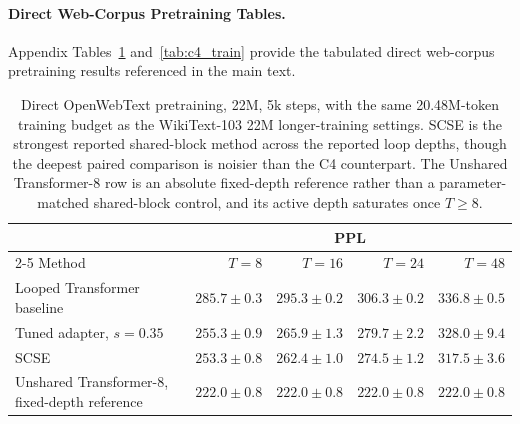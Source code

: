\documentclass[letterpaper]{article} %
\newcommand{\SCSE}{\textsc{SCSE}}
\theoremstyle{remark}
\begin{document}
\paragraph{Direct Web-Corpus Pretraining Tables.} Appendix Tables~\ref{tab:owt_train} and~\ref{tab:c4_train} provide the tabulated direct web-corpus pretraining results referenced in the main text.

\begin{table}[t!]
	\centering
	\small
	\begin{tabular}{lrrrr}
		\toprule
		                                              & \multicolumn{4}{c}{PPL}                                                                            \\
		\cmidrule(lr){2-5}
		Method                                        & $T=8$                   & $T=16$                 & $T=24$                 & $T=48$                 \\
		\midrule
		Looped Transformer baseline                   & $285.7\pm0.3$           & $295.3\pm0.2$          & $306.3\pm0.2$          & $336.8\pm0.5$          \\
		Tuned adapter, $s=0.35$                       & $255.3\pm0.9$           & $265.9\pm1.3$          & $279.7\pm2.2$          & $328.0\pm9.4$          \\
		\SCSE{}                                       & $\mathbf{253.3\pm0.8}$  & $\mathbf{262.4\pm1.0}$ & $\mathbf{274.5\pm1.2}$ & $\mathbf{317.5\pm3.6}$ \\
		\addlinespace[2pt]
		Unshared Transformer-8, fixed-depth reference & $222.0\pm0.8$           & $222.0\pm0.8$          & $222.0\pm0.8$          & $222.0\pm0.8$          \\
		\bottomrule
	\end{tabular}
	\caption{Direct OpenWebText pretraining, 22M, 5k steps, with the same 20.48M-token training budget as the WikiText-103 22M longer-training settings.  \SCSE{} is the strongest reported shared-block method across the reported loop depths, though the deepest paired comparison is noisier than the C4 counterpart.  The Unshared Transformer-8 row is an absolute fixed-depth reference rather than a parameter-matched shared-block control, and its active depth saturates once $T\ge 8$.}
	\label{tab:owt_train}
\end{table}
\end{document}
